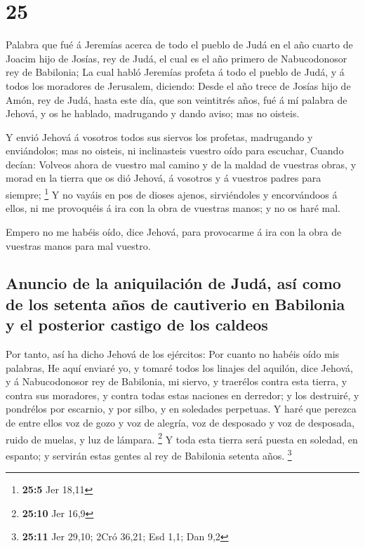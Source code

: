 \hypertarget{section-24}{%
\section{25}\label{section-24}}

 Palabra que fué á Jeremías acerca de todo el pueblo de Judá
en el año cuarto de Joacim hijo de Josías, rey de Judá, el cual es el
año primero de Nabucodonosor rey de Babilonia;  La cual
habló Jeremías profeta á todo el pueblo de Judá, y á todos los moradores
de Jerusalem, diciendo:  Desde el año trece de Josías hijo
de Amón, rey de Judá, hasta este día, que son veintitrés años, fué á mí
palabra de Jehová, y os he hablado, madrugando y dando aviso; mas no
oisteis.

 Y envió Jehová á vosotros todos sus siervos los profetas,
madrugando y enviándolos; mas no oisteis, ni inclinasteis vuestro oído
para escuchar,  Cuando decían: Volveos ahora de vuestro mal
camino y de la maldad de vuestras obras, y morad en la tierra que os dió
Jehová, á vosotros y á vuestros padres para siempre; \footnote{\textbf{25:5}
  Jer 18,11}  Y no vayáis en pos de dioses ajenos,
sirviéndoles y encorvándoos á ellos, ni me provoquéis á ira con la obra
de vuestras manos; y no os haré mal.

 Empero no me habéis oído, dice Jehová, para provocarme á
ira con la obra de vuestras manos para mal vuestro.

\hypertarget{anuncio-de-la-aniquilaciuxf3n-de-juduxe1-asuxed-como-de-los-setenta-auxf1os-de-cautiverio-en-babilonia-y-el-posterior-castigo-de-los-caldeos}{%
\subsection{Anuncio de la aniquilación de Judá, así como de los setenta
años de cautiverio en Babilonia y el posterior castigo de los
caldeos}\label{anuncio-de-la-aniquilaciuxf3n-de-juduxe1-asuxed-como-de-los-setenta-auxf1os-de-cautiverio-en-babilonia-y-el-posterior-castigo-de-los-caldeos}}

 Por tanto, así ha dicho Jehová de los ejércitos: Por cuanto
no habéis oído mis palabras,  He aquí enviaré yo, y tomaré
todos los linajes del aquilón, dice Jehová, y á Nabucodonosor rey de
Babilonia, mi siervo, y traerélos contra esta tierra, y contra sus
moradores, y contra todas estas naciones en derredor; y los destruiré, y
pondrélos por escarnio, y por silbo, y en soledades perpetuas.
 Y haré que perezca de entre ellos voz de gozo y voz de
alegría, voz de desposado y voz de desposada, ruido de muelas, y luz de
lámpara. \footnote{\textbf{25:10} Jer 16,9}  Y toda esta
tierra será puesta en soledad, en espanto; y servirán estas gentes al
rey de Babilonia setenta años. \footnote{\textbf{25:11} Jer 29,10; 2Cró
  36,21; Esd 1,1; Dan 9,2}

